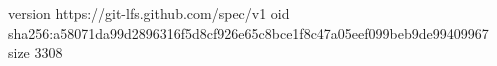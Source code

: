 version https://git-lfs.github.com/spec/v1
oid sha256:a58071da99d2896316f5d8cf926e65c8bce1f8c47a05eef099beb9de99409967
size 3308
